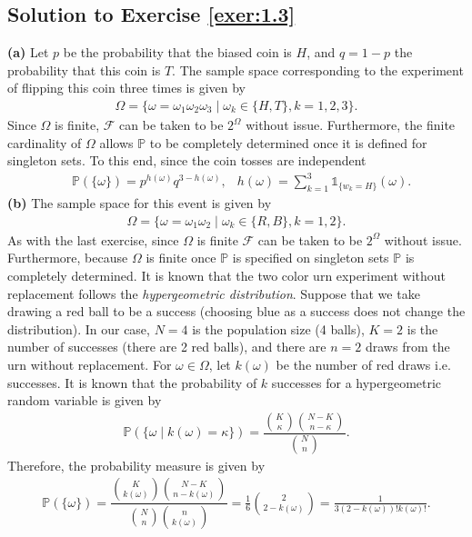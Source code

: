 \documentclass[12pt]{book}
\numberwithin{equation}{chapter}
\theoremstyle{plain}
\numberwithin{theorem}{section}
\theoremstyle{definition}
\numberwithin{exercise}{chapter}
\newcommand{\<}{\langle}
\renewcommand{\>}{\rangle}
\renewcommand{\(}{\left(}
\renewcommand{\)}{\right)}
\renewcommand{\[}{\left[}
\renewcommand{\]}{\right]}
\newcommand\Ib{\mathds{1}} 	%
\newcommand\Pb{\mathds{P}}
\newcommand\Fc{\mathscr{F}}
\newcommand\om{\omega}
\newcommand\Om{\Omega}
\begin{document}
\subsection*{Solution to Exercise \ref{exer:1.3}}
\textbf{(a)}
Let $p$ be the probability that the biased coin is $H$, and $q = 1 - p$ the probability that this coin is $T$. The sample space corresponding to the experiment of flipping this coin three times is given by
\begin{align}
\Om
	= \{ 
		\om= \om_1 \om_2 \om_3  \mid  \om_k \in \{ H, T\}, k = 1,2,3
	\}.
\end{align}
Since $\Om$ is finite, $\Fc$ can be taken to be $2^\Om$ without issue. Furthermore, the finite cardinality of $\Om$ allows $\Pb$ to be completely determined once it is defined for singleton sets. To this end, since the coin tosses are independent
\begin{align}
&\Pb\( \{ \om \} \)
	= p^{ h(\om) } q^{3 - h(\om)},
& h(\om)
	= \sum_{k=1}^3 \Ib_{\{w_k = H\}} (\om).
\end{align}
\textbf{(b)}
The sample space for this event is given by
\begin{align}
\Om
	= \{ 
		\om = \om_1 \om_2 \mid \om_k \in \{ R, B\}, k = 1,2
	\}.
\end{align}
As with the last exercise, since $\Om$ is finite $\Fc$ can be taken to be $2^\Om$ without issue. Furthermore, because $\Om$ is finite once $\Pb$ is specified on singleton sets $\Pb$ is completely determined. It is known that the two color urn experiment without replacement follows the \textit{hypergeometric distribution}. Suppose that we take drawing a red ball to be a success (choosing blue as a success does not change the distribution). In our case, $N = 4$ is the population size (4 balls), $K = 2$ is the number of successes (there are 2 red balls), and there are $n =2 $ draws from the urn without replacement. For $\om \in \Om$, let $k(\om)$ be the number of red draws i.e. successes. It is known that the probability of $k$ successes for a hypergeometric random variable is given by
\begin{align}
\Pb( \{ \om \mid k(\om)= \kappa\} ) 
	= \dfrac{ \binom{K}{\kappa} \binom{N - K}{n - \kappa}}{ \binom{ N } { n} }.
\end{align}
Therefore, the probability measure is given by
\begin{align}
\Pb\( \{ \om \} \) 
	= \dfrac{ \binom{K}{k(\om)} \binom{N - K}{n - k(\om)}}{ \binom{ N } { n} \binom{n}{k(\om)}}
	= \frac{1}{6} \binom{2}{2-k(\om)}
	= \frac{1}{3 (2-k(\om))! k(\om)!} .
\end{align}
\end{document}
